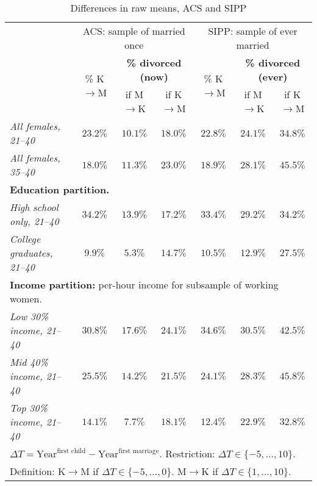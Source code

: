 \documentclass[12pt,letter]{article}
\begin{document}
\begin{table}[h!]
\begin{center}
\begin{tabular}{|l|c||c|c||c||c|c|}\cline{2-7}
\multicolumn{1}{c|}{} & \multicolumn{3}{c||}{\small ACS: sample of married once} & \multicolumn{3}{c|}{\small SIPP: sample of  ever married} \\\cline{2-7}
\multicolumn{1}{c|}{}  & \multirow{2}{*}{\small \% K$\to$M}& \multicolumn{2}{c||}{\textbf{\% divorced (now)}} & \multirow{2}{*}{\footnotesize \% K$\to$M }& \multicolumn{2}{c|}{\textbf{\% divorced (ever)}} \\\cline{3-4}\cline{6-7}
\multicolumn{1}{c|}{}  &  &\small if M$\to$K &  \small if K$\to$M & & \small if M$\to$K & \small if K$\to$M \\\hline
\textit{All females, 21--40}  & $23.2\%$ & $10.1\%$ & $18.0\%$ & $22.8\%$ & $24.1\%$ & $34.8\%$ \\
\textit{All females, 35--40} & $18.0\%$ & $11.3\%$ & $23.0\%$ & $18.9\%$ & $28.1\%$ & $45.5\%$ \\\hline\hline
\multicolumn{7}{|p{0.9\linewidth}|}{\footnotesize \textbf{Education partition.}}\\\hline
\textit{High school only, 21--40} & $34.2\%$ & $13.9\%$ & $17.2\%$ & $33.4\%$ & $29.2\%$  & $34.2\%$ \\
\textit{College graduates, 21--40} & $9.9\%$ & $5.3\%$ & $14.7\%$ & $10.5\%$ & $12.9\%$ & $27.5\%$ \\\hline\hline
\multicolumn{7}{|p{0.9\linewidth}|}{\footnotesize \textbf{Income partition:} per-hour income for subsample of working women.}\\\hline
\textit{Low 30\% income, 21--40} & $30.8\%$ & $17.6\%$ & $24.1\%$ & $34.6\%$ & $30.5\%$ &  $42.5\%$ \\
\textit{Mid 40\% income, 21--40} & $25.5\%$ & $14.2\%$ & $21.5\%$ & $24.1\%$ & $28.3\%$ & $45.8\%$ \\
\textit{Top 30\% income, 21--40} & $14.1\%$ & $7.7\%$ & $18.1\%$ & $12.4\%$ & $22.9\%$  & $32.8\%$ \\\hline
\multicolumn{7}{|p{0.9\linewidth}|}{\footnotesize $\Delta T = \text{Year}^{\text{first child}} - \text{Year}^{\text{first marriage}}$. Restriction: $\Delta T \in \{-5,...,10\}$.}\\
\multicolumn{7}{|p{0.9\linewidth}|}{\footnotesize Definition: K$\to$M if $\Delta T \in \{-5,...,0\}$. M$\to$K if $\Delta T \in \{1,...,10\}$.}\\
\hline
\end{tabular}
\caption{Differences in raw means, ACS and SIPP\label{diff-raw}}
\end{center}
\end{table}
\end{document}
